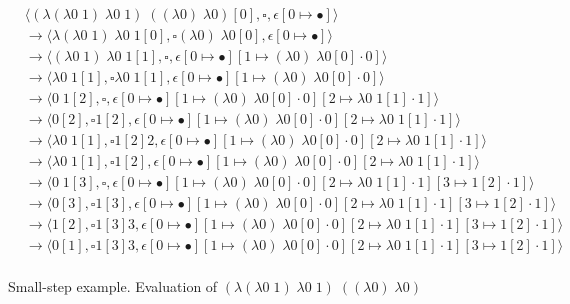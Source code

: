 \begin{sidewaysfigure}
\begin{align*}
&\langle (\lambda(\lambda0\;1)\;\lambda0\;1)\;((\lambda0)\;\lambda0)[0],\square,\epsilon[0\mapsto\bullet]\rangle\\
&\rightarrow\langle \lambda(\lambda0\;1)\;\lambda0\;1[0],\square (\lambda0)\;\lambda0[0],\epsilon[0\mapsto\bullet]\rangle\\ 
&\rightarrow\langle (\lambda0\;1)\;\lambda0\;1[1],\square,\epsilon[0\mapsto\bullet][1\mapsto(\lambda0)\;\lambda0[0]\cdot0]\rangle\\ 
&\rightarrow\langle \lambda0\;1[1],\square \lambda0\;1[1],\epsilon[0\mapsto\bullet][1\mapsto(\lambda0)\;\lambda0[0]\cdot0]\rangle\\ 
&\rightarrow\langle 0\;1[2],\square,\epsilon[0\mapsto\bullet][1\mapsto(\lambda0)\;\lambda0[0]\cdot0][2\mapsto\lambda0\;1[1]\cdot1]\rangle\\ 
&\rightarrow\langle 0[2],\square 1[2],\epsilon[0\mapsto\bullet][1\mapsto(\lambda0)\;\lambda0[0]\cdot0][2\mapsto\lambda0\;1[1]\cdot1]\rangle\\ 
&\rightarrow\langle \lambda0\;1[1],\square 1[2] 2,\epsilon[0\mapsto\bullet][1\mapsto(\lambda0)\;\lambda0[0]\cdot0][2\mapsto\lambda0\;1[1]\cdot1]\rangle\\ 
&\rightarrow\langle \lambda0\;1[1],\square 1[2],\epsilon[0\mapsto\bullet][1\mapsto(\lambda0)\;\lambda0[0]\cdot0][2\mapsto\lambda0\;1[1]\cdot1]\rangle\\ 
&\rightarrow\langle 0\;1[3],\square,\epsilon[0\mapsto\bullet][1\mapsto(\lambda0)\;\lambda0[0]\cdot0][2\mapsto\lambda0\;1[1]\cdot1][3\mapsto1[2]\cdot1]\rangle\\ 
&\rightarrow\langle 0[3],\square 1[3],\epsilon[0\mapsto\bullet][1\mapsto(\lambda0)\;\lambda0[0]\cdot0][2\mapsto\lambda0\;1[1]\cdot1][3\mapsto1[2]\cdot1]\rangle\\ 
&\rightarrow\langle 1[2],\square 1[3] 3,\epsilon[0\mapsto\bullet][1\mapsto(\lambda0)\;\lambda0[0]\cdot0][2\mapsto\lambda0\;1[1]\cdot1][3\mapsto1[2]\cdot1]\rangle\\ 
&\rightarrow\langle 0[1],\square 1[3] 3,\epsilon[0\mapsto\bullet][1\mapsto(\lambda0)\;\lambda0[0]\cdot0][2\mapsto\lambda0\;1[1]\cdot1][3\mapsto1[2]\cdot1]\rangle\\ 
\end{align*}
\caption{Small-step \ce example. Evaluation of
$(\lambda(\lambda0\;1)\;\lambda0\;1)\;((\lambda0)\;\lambda0)$}
\end{sidewaysfigure}


